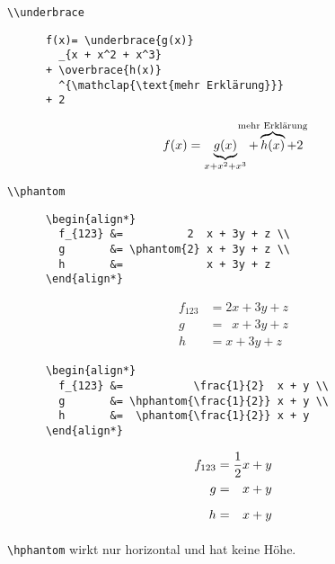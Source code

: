 \begin{frame}[fragile]{\lstinline+\\underbrace+}
  \begin{CodeExample}{0.58}
    \begin{lstlisting}
      f(x)= \underbrace{g(x)}
        _{x + x^2 + x^3}
      + \overbrace{h(x)}
        ^{\mathclap{\text{mehr Erklärung}}}
      + 2
    \end{lstlisting}
  \CodeResult
    \begin{equation*}
      f(x)= \underbrace{g(x)}_{x + x^2 + x^3}
      + \overbrace{h(x)}^{
        \mathclap{\text{mehr Erklärung}}
      } + 2
    \end{equation*}
  \end{CodeExample}
\end{frame}

\begin{frame}[fragile]{\lstinline+\\phantom+}
  \begin{CodeExample}{0.60}
    \begin{lstlisting}
      \begin{align*}
        f_{123} &=          2  x + 3y + z \\
        g       &= \phantom{2} x + 3y + z \\
        h       &=             x + 3y + z
      \end{align*}
    \end{lstlisting}
  \CodeResult%
    \begin{align*}
      f_{123} &=          2  x + 3y + z \\
      g       &= \phantom{2} x + 3y + z \\
      h       &=             x + 3y + z
    \end{align*}
  \end{CodeExample}
  \begin{CodeExample}{0.70}
    \begin{lstlisting}
      \begin{align*}
        f_{123} &=           \frac{1}{2}  x + y \\
        g       &= \hphantom{\frac{1}{2}} x + y \\
        h       &=  \phantom{\frac{1}{2}} x + y
      \end{align*}
    \end{lstlisting}
  \CodeResult
    \begin{align*}
      f_{123} &=           \frac{1}{2}  x + y \\
      g       &= \hphantom{\frac{1}{2}} x + y \\
      h       &=  \phantom{\frac{1}{2}} x + y
    \end{align*}
  \end{CodeExample}
  \lstinline+\hphantom+ wirkt nur horizontal und hat keine Höhe.
\end{frame}

